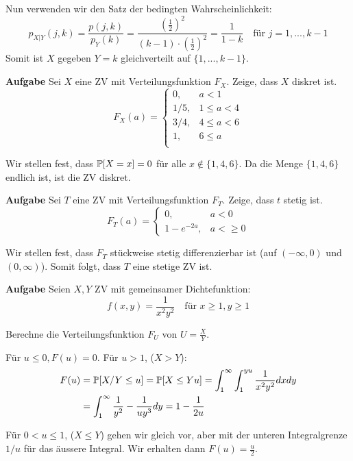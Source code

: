 Nun verwenden wir den Satz der bedingten Wahrscheinlichkeit:
$$p_{X|Y}(j, k) = \frac{p(j,k)}{p_Y(k)} = \frac{\left( \frac{1}{2} \right)^2}{(k-1) \cdot \left( \frac{1}{2} \right)^2} = \frac{1}{1 - k} \quad \text{für } j = 1,...,k-1$$
Somit ist $X$ gegeben $Y = k$ gleichverteilt auf $\{ 1, ..., k-1 \}$.

\hrulefill

\textbf{Aufgabe}
Sei $X$ eine ZV mit Verteilungsfunktion $F_X$. Zeige, dass $X$ diskret ist.
$$ F_X(a) = \begin{cases}
	0, 		& a < 1 \\
	1/5, 	& 1 \leq a < 4 \\
	3/4, 	& 4 \leq a < 6 \\
	1, 		& 6 \leq a \\
\end{cases}$$ \medskip

Wir stellen fest, dass $\mathbb{P}[X = x] = 0$ für alle $x \notin \{1,4,6\}$. Da die Menge $\{1,4,6\}$ endlich ist, ist die ZV diskret.

\hrulefill

\textbf{Aufgabe}
Sei $T$ eine ZV mit Verteilungsfunktion $F_T$. Zeige, dass $t$ stetig ist.
$$ F_T(a) = \begin{cases}
	0, 				& a < 0 \\
	1 - e^{-2a}, 	& a < \geq 0
\end{cases}$$ \medskip

Wir stellen fest, dass $F_T$ stückweise stetig differenzierbar ist (auf $(-\infty, 0)$ und $(0, \infty)$). Somit folgt, dass $T$ eine stetige ZV ist.

\hrulefill

\textbf{Aufgabe}
Seien $X,Y$ ZV mit gemeinsamer Dichtefunktion:
$$f(x,y) = \frac{1}{x^2 y^2} \quad \text{für } x \geq 1, y \geq 1$$

Berechne die Verteilungsfunktion $F_U$ von $U = \frac{X}{Y}$. \medskip

Für $u \leq 0, F(u) = 0$. Für $u > 1$, ($X > Y$):
\begin{align*}
	F(u) &= \mathbb{P}[X/Y \leq u] = \mathbb{P}[X \leq Yu] = \int_1^\infty \int_1^{yu} \frac{1}{x^2 y^2} dxdy\\
	&= \int_1^\infty \frac{1}{y^2} - \frac{1}{uy^3} dy = 1 - \frac{1}{2u}
\end{align*}

Für $0 < u \leq 1$, ($X \leq Y$) gehen wir gleich vor, aber mit der unteren Integralgrenze $1/u$ für das äussere Integral. Wir erhalten dann $F(u) = \frac{u}{2}$.

